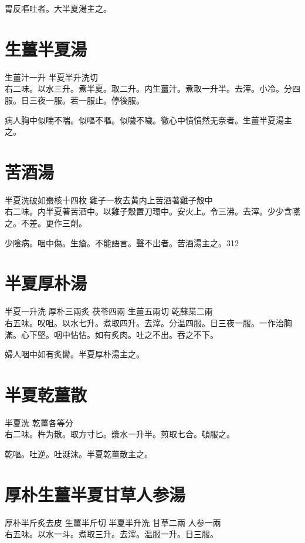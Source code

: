 胃反嘔吐者。大半夏湯主之。

\section{生薑半夏湯}

生薑汁{\scriptsize 一升} 半夏{\scriptsize 半升洗切}\\
右二味。以水三升。煮半夏。取二升。内生薑汁。煮取一升半。去滓。小冷。分四服。日三夜一服。若一服止。停後服。

病人胸中似喘不喘。似嘔不嘔。似噦不噦。徹心中憒憒然无奈者。生薑半夏湯主之。

\section{苦酒湯}

半夏{\scriptsize 洗破如棗核十四枚} 雞子{\scriptsize 一枚去黄内上苦酒著雞子殼中}\\
右二味。内半夏著苦酒中。以雞子殼置刀環中。安火上。令三沸。去滓。少少含嚥之。不差。更作三劑。

少陰病。咽中傷。生瘡。不能語言。聲不出者。苦酒湯主之。312

\section{半夏厚朴湯}

半夏{\scriptsize 一升洗} 厚朴{\scriptsize 三兩炙} 茯苓{\scriptsize 四兩} 生薑{\scriptsize 五兩切} 乾蘇枼{\scriptsize 二兩}\\
右五味。㕮咀。以水七升。煮取四升。去滓。分温四服。日三夜一服。{\scriptsize 一作治胸滿。心下堅。咽中怗怗。如有炙肉。吐之不出。吞之不下。}

婦人咽中如有炙臠。半夏厚朴湯主之。

\section{半夏乾薑散}

半夏{\scriptsize 洗} 乾薑{\scriptsize 各等分}\\
右二味。杵为散。取方寸匕。漿水一升半。煎取七合。頓服之。

乾嘔。吐逆。吐涎沫。半夏乾薑散主之。

\section{厚朴生薑半夏甘草人参湯}

厚朴{\scriptsize 半斤炙去皮} 生薑{\scriptsize 半斤切} 半夏{\scriptsize 半升洗} 甘草{\scriptsize 二兩} 人参{\scriptsize 一兩}\\
右五味。以水一斗。煮取三升。去滓。温服一升。日三服。

